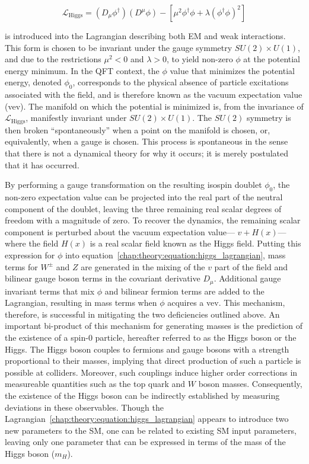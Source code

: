 \begin{equation}
\mathcal{L}_{\textrm{Higgs}} =
\left(D_{\mu}\phi^{\dagger}\right)\left(D^{\mu}\phi\right)
- \left[ \mu^2 \phi^{\dagger}\phi + \lambda (\phi^{\dagger}\phi)^2\right]
\label{chap:theory:equation:higgs_lagrangian}
\end{equation}

\noindent
is introduced into the Lagrangian describing both EM and weak
interactions. This form is chosen to be invariant under the gauge
symmetry $SU(2) \times U(1)$, and due to the restrictions $\mu^2 < 0$
and $\lambda > 0$, to yield non-zero $\phi$ at the potential energy
minimum. In the QFT context, the $\phi$ value that minimizes the
potential energy, denoted $\phi_0$, corresponds to the physical
absence of particle excitations associated with the field, and is
therefore known as the vacuum expectation value (vev). The manifold on
which the potential is minimized is, from the invariance of
$\mathcal{L}_{\textrm{Higgs}}$, manifestly invariant under
$SU(2) \times U(1)$. The $SU(2)$ symmetry is then broken ``spontaneously''
when a point on the manifold is chosen, or, equivalently, when a gauge
is chosen. This process is spontaneous in the sense that there is not
a dynamical theory for why it occurs; it is merely postulated that it
has occurred. 

By performing a gauge transformation on the resulting isospin doublet
$\phi_0$, the non-zero expectation value can be projected into the
real part of the neutral component of the doublet, leaving the three
remaining real scalar degrees of freedom with a magnitude of zero.
To recover the dynamics, the remaining scalar component is perturbed
about the vacuum expectation value--- $v + H(x)$--- where the field
$H(x)$ is a real scalar field known as the Higgs field. Putting this
expression for $\phi$ into
equation~\ref{chap:theory:equation:higgs_lagrangian}, mass terms for
$W^{\pm}$ and $Z$ are generated in the mixing of the $v$ part of the
field and bilinear gauge boson terms in the covariant derivative
$D_{\mu}$. Additional gauge invariant terms that mix $\phi$
and bilinear fermion terms are added to the Lagrangian, resulting in
mass terms when $\phi$ acquires a vev. This mechanism, therefore, is successful in mitigating the two
deficiencies outlined above. An important bi-product of this mechanism
for generating masses is the prediction of the existence of a spin-0
particle, hereafter referred to as the Higgs boson or the
Higgs. The Higgs boson couples to fermions and gauge bosons with a
strength proportional to their masses, implying that direct production of
such a particle is possible at colliders. Moreover, such couplings
induce higher order corrections in measureable quantities such as the
top quark and $W$ boson masses. Consequently, the existence of the
Higgs boson can be indirectly established by measuring deviations in
these observables. Though the
Lagrangian~\ref{chap:theory:equation:higgs_lagrangian} appears to
introduce two new parameters to the SM, one can be related to existing
SM input parameters, leaving only one parameter that can be expressed
in terms of the mass of the Higgs boson ($m_H$).

